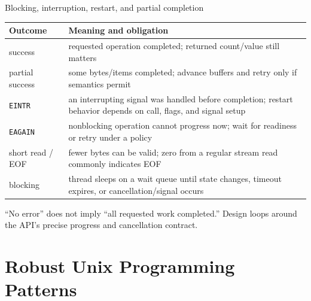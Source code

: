\documentclass[aspectratio=169,11pt]{beamer}
\newcommand{\code}[1]{\texttt{#1}}
\begin{document}
\begin{frame}{Blocking, interruption, restart, and partial completion}
  \small
  \begin{tabularx}{\textwidth}{@{}lX@{}}
    \toprule
    \textbf{Outcome} & \textbf{Meaning and obligation} \\
    \midrule
    success & requested operation completed; returned count/value still matters \\
    partial success & some bytes/items completed; advance buffers and retry only if semantics permit \\
    \code{EINTR} & an interrupting signal was handled before completion; restart behavior depends on call, flags, and signal setup \\
    \code{EAGAIN} & nonblocking operation cannot progress now; wait for readiness or retry under a policy \\
    short read / EOF & fewer bytes can be valid; zero from a regular stream read commonly indicates EOF \\
    blocking & thread sleeps on a wait queue until state changes, timeout expires, or cancellation/signal occurs \\
    \bottomrule
  \end{tabularx}
  \begin{tcolorbox}[title=Robustness rule,colback=osgreen!5,colframe=osgreen!65]
    ``No error'' does not imply ``all requested work completed.'' Design loops around the API's precise progress and cancellation contract.
  \end{tcolorbox}
\end{frame}

\section{Robust Unix Programming Patterns}
\end{document}
